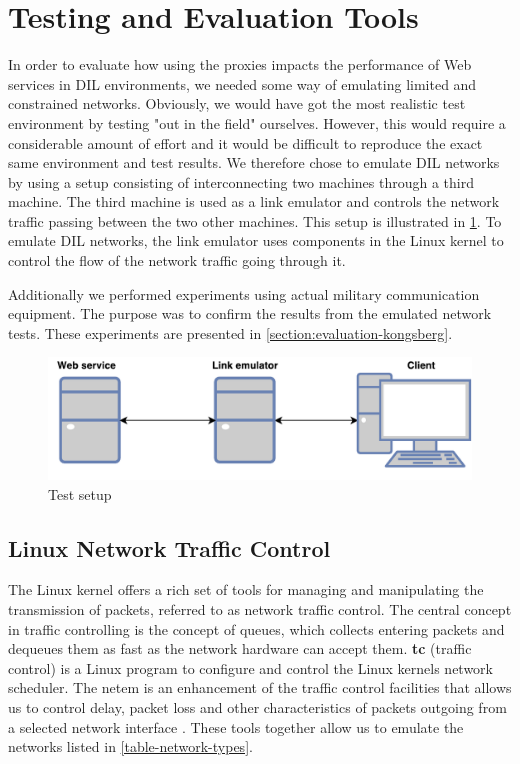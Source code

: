 \section{Testing and Evaluation Tools}

In order to evaluate how using the proxies impacts the performance of Web
services in DIL environments, we needed some way of emulating limited and
constrained networks. Obviously, we would have got the most realistic test
environment by testing "out in the field" ourselves. However, this would require
a considerable amount of effort and it would be difficult to reproduce the exact
same environment and test results. We therefore chose to emulate DIL networks by
using a setup consisting of interconnecting two machines through a third
machine. The third machine is used as a link emulator and controls the network
traffic passing between the two other machines. This setup is illustrated in
\cref{figure-testing-environment-simple}. To emulate DIL networks, the link
emulator uses components in the Linux kernel to control the flow of the network
traffic going through it.

Additionally we performed experiments using actual military communication
equipment. The purpose was to confirm the results from the emulated network
tests. These experiments are presented in \cref{section:evaluation-kongsberg}.

\begin{figure}[h]
\includegraphics[scale=0.73]{images/testing_environment_simple.pdf}
\caption{Test setup}
\label{figure-testing-environment-simple}
\end{figure}

\subsection{Linux Network Traffic Control}

The Linux kernel offers a rich set of tools for managing and manipulating the
transmission of packets, referred to as network traffic control. The central
concept in traffic controlling is the concept of queues, which collects entering
packets and dequeues them as fast as the network hardware can accept them.
\textbf{tc} (traffic control) is a Linux program to configure and control the
Linux kernels network scheduler. The \gls{netem} is an enhancement of the
traffic control facilities that allows us to control delay, packet loss and
other characteristics of packets outgoing from a selected network interface
\cite{man-netem}. These tools together allow us to emulate the networks listed in
\cref{table-network-types}.

